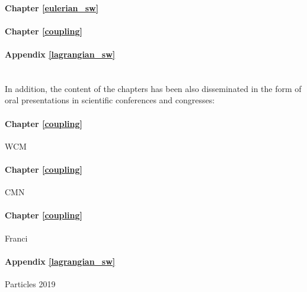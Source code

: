 \paragraph{Chapter \ref{eulerian_sw}} 
\paragraph{Chapter \ref{coupling}} 
\paragraph{Appendix \ref{lagrangian_sw}} 
\\

In addition, the content of the chapters has been also disseminated in the form of oral presentations in scientific conferences and congresses:

\paragraph{Chapter \ref{coupling}} WCM
\paragraph{Chapter \ref{coupling}} CMN
\paragraph{Chapter \ref{coupling}} Franci
\paragraph{Appendix \ref{lagrangian_sw}} Particles 2019




